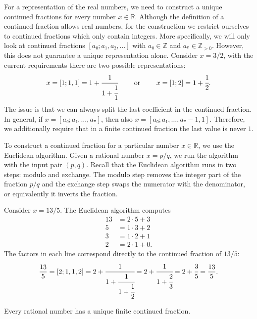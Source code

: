 For a representation of the real numbers,
we need to construct a unique continued fractions for every number $x ∈ ℝ$.
Although the definition of a continued fraction allows real numbers,
for the construction we restrict ourselves to continued fractions which only
contain integers.
More specifically, we will only look at continued fractions $[a₀; a₁, a₂, …]$
with $a₀ ∈ ℤ$ and $aₙ ∈ ℤ_{> 0}$.
However, this does not guarantee a unique representation alone.
Consider $x = 3/2$, with the current requirements there are two possible representations:
\[
  x = [1; 1, 1] = 1 + \cfrac{1}{1 + \cfrac{1}{1}} \qquad \text{ or } \qquad x = [1; 2] = 1 + \cfrac{1}{2}.
\]
The issue is that we can always split the last coefficient in the continued fraction.
In general, if $x = [a₀; a₁, …, aₙ]$, then also $x = [a₀; a₁, …, aₙ - 1, 1]$.
Therefore, we additionally require that in a finite continued fraction the last value is never $1$.

To construct a continued fraction for a particular number $x ∈ ℝ$,
we use the Euclidean algorithm.
Given a rational number $x = p/q$, we run the algorithm with the input pair $(p, q)$.
Recall that the Euclidean algorithm runs in two steps: modulo and exchange.
The modulo step removes the integer part of the fraction $p/q$
and the exchange step swaps the numerator with the denominator,
or equivalently it inverts the fraction.

\begin{example}
  Consider $x = 13/5$.
  The Euclidean algorithm computes
  \begin{align*}
    13 & = 2 · 5 + 3 \\
     5 & = 1 · 3 + 2 \\
     3 & = 1 · 2 + 1 \\
     2 & = 2 · 1 + 0.
  \end{align*}
  The factors in each line correspond directly to the continued fraction of $13/5$:
  \[
    \frac{13}{5}
    = [2; 1, 1, 2]
    = 2 + \cfrac{1}{1 + \cfrac{1}{1 + \cfrac{1}{2}}}
    = 2 + \cfrac{1}{1 + \cfrac{2}{3}}
    = 2 + \cfrac{3}{5}
    = \frac{13}{5}.
  \]
\end{example}

\begin{theorem}
  \label{thm:rat-cf}
  Every rational number has a unique finite continued fraction.
\end{theorem}

